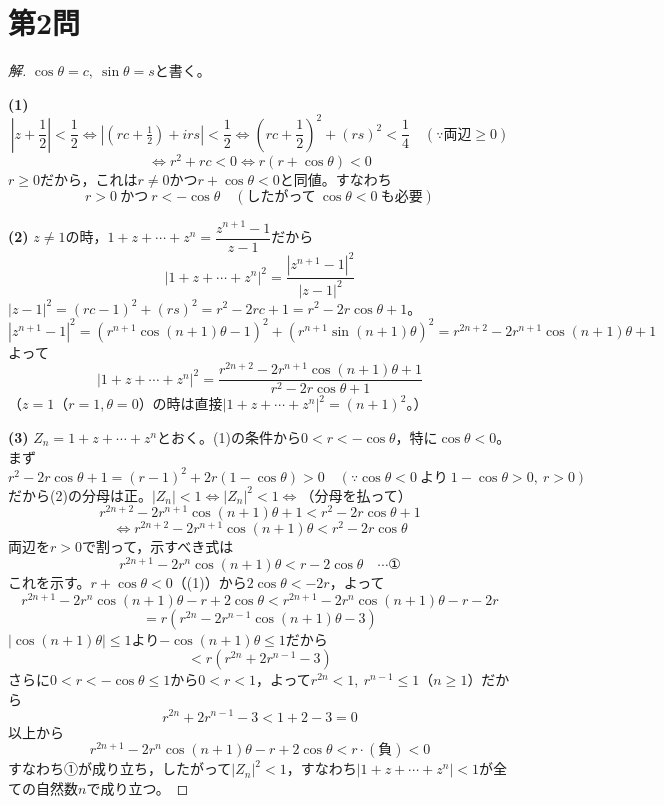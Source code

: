 \documentclass[../main.tex]{subfiles}
\begin{document}
\newpage

\section*{第2問}

\begin{proof}[解]
  $\cos\theta=c,\ \sin\theta=s$と書く。

  \textbf{(1)}
  \[
    \left|z+\frac12\right|<\frac12 \iff \left|(rc+\tfrac12)+irs\right|<\frac12 \iff \left(rc+\frac12\right)^2+(rs)^2<\frac14 \quad(\because\text{両辺}\ge0)
  \]
  \[
    \iff r^2+rc<0 \iff r(r+\cos\theta)<0
  \]
  $r\ge0$だから，これは$r\ne0$かつ$r+\cos\theta<0$と同値。すなわち
  \[
    r>0\ \text{かつ}\ r<-\cos\theta \quad(\text{したがって}\ \cos\theta<0\ \text{も必要})
  \]

  \textbf{(2)} $z\ne1$の時，$1+z+\cdots+z^n=\dfrac{z^{n+1}-1}{z-1}$だから
  \[
    \left|1+z+\cdots+z^n\right|^2=\frac{|z^{n+1}-1|^2}{|z-1|^2}
  \]
  $|z-1|^2=(rc-1)^2+(rs)^2=r^2-2rc+1=r^2-2r\cos\theta+1$。
  \[
    |z^{n+1}-1|^2=\left(r^{n+1}\cos(n+1)\theta-1\right)^2+\left(r^{n+1}\sin(n+1)\theta\right)^2=r^{2n+2}-2r^{n+1}\cos(n+1)\theta+1
  \]
  よって
  \[
    |1+z+\cdots+z^n|^2=\frac{r^{2n+2}-2r^{n+1}\cos(n+1)\theta+1}{r^2-2r\cos\theta+1}
  \]
  （$z=1$（$r=1,\theta=0$）の時は直接$|1+z+\cdots+z^n|^2=(n+1)^2$。）

  \textbf{(3)} $Z_n=1+z+\cdots+z^n$とおく。(1)の条件から$0<r<-\cos\theta$，特に$\cos\theta<0$。まず
  \[
    r^2-2r\cos\theta+1=(r-1)^2+2r(1-\cos\theta)>0 \quad(\because\cos\theta<0\ \text{より}\ 1-\cos\theta>0,\ r>0)
  \]
  だから(2)の分母は正。$|Z_n|<1\iff|Z_n|^2<1\iff$（分母を払って）
  \[
    r^{2n+2}-2r^{n+1}\cos(n+1)\theta+1<r^2-2r\cos\theta+1
  \]
  \[
    \iff r^{2n+2}-2r^{n+1}\cos(n+1)\theta<r^2-2r\cos\theta
  \]
  両辺を$r>0$で割って，示すべき式は
  \[
    r^{2n+1}-2r^n\cos(n+1)\theta<r-2\cos\theta \quad\cdots\text{①}
  \]
  これを示す。$r+\cos\theta<0$（(1)）から$2\cos\theta<-2r$，よって
  \[
    r^{2n+1}-2r^n\cos(n+1)\theta-r+2\cos\theta<r^{2n+1}-2r^n\cos(n+1)\theta-r-2r
  \]
  \[
    =r\left(r^{2n}-2r^{n-1}\cos(n+1)\theta-3\right)
  \]
  $|\cos(n+1)\theta|\le1$より$-\cos(n+1)\theta\le1$だから
  \[
    <r\left(r^{2n}+2r^{n-1}-3\right)
  \]
  さらに$0<r<-\cos\theta\le1$から$0<r<1$，よって$r^{2n}<1,\ r^{n-1}\le1$（$n\ge1$）だから
  \[
    r^{2n}+2r^{n-1}-3<1+2-3=0
  \]
  以上から
  \[
    r^{2n+1}-2r^n\cos(n+1)\theta-r+2\cos\theta<r\cdot(\text{負})<0
  \]
  すなわち①が成り立ち，したがって$|Z_n|^2<1$，すなわち$|1+z+\cdots+z^n|<1$が全ての自然数$n$で成り立つ。
\end{proof}
\end{document}
